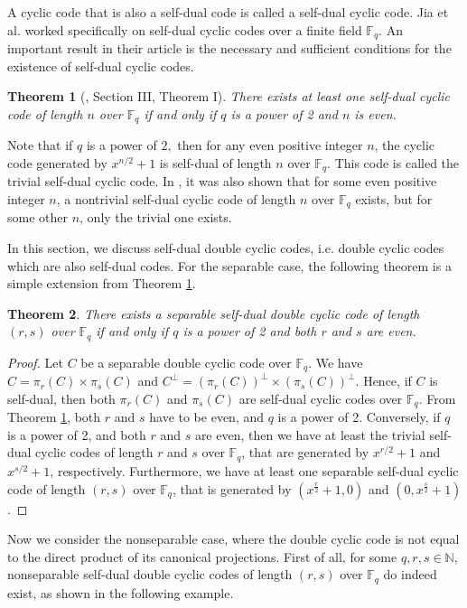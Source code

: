 \documentclass[12pt]{article}
\newtheorem{theorem}{Theorem}[section]
\begin{document}
	A cyclic code that is also a self-dual code is called a self-dual cyclic code. Jia et al. \cite{Jia2011} worked specifically on self-dual cyclic codes over a finite field $\mathbb{F}_q.$  An important result in their article is the necessary and sufficient conditions for the existence of self-dual cyclic codes.
	\begin{theorem}[\cite{Jia2011}, Section III, Theorem I]\label{Jia31}
		There exists at least one self-dual cyclic code of length $n$ over $\mathbb{F}_q$ if and only if $q$ is a power of 2 and $n$ is even.
	\end{theorem}
	Note that if $q$ is a power of $2,$ then for any even positive integer $n$, the cyclic code generated by $x^{n/2}+1$ is self-dual of length $n$ over $\mathbb{F}_{q}$. This code is called the trivial self-dual cyclic code. In \cite{Jia2011}, it was also shown that for some even positive integer $n$, a nontrivial self-dual cyclic code of length $n$ over $\mathbb{F}_{q}$ exists, but for some other $n$, only the trivial one exists.
	
	In this section, we discuss self-dual double cyclic codes, i.e. double cyclic codes which are also self-dual codes. For the separable case, the following theorem is a simple extension from Theorem \ref{Jia31}.
	\begin{theorem}\label{existsep}
		There exists a separable self-dual double cyclic code of length $(r,s)$ over $\mathbb{F}_q$ if and only if $q$ is a power of 2 and both $r$ and $s$ are even.
	\end{theorem}
	\begin{proof}
		Let $C$ be a separable double cyclic code over $\mathbb{F}_q$. We have $C=\pi_r(C)\times \pi_s(C)$ and $C^{\perp}=(\pi_r(C))^{\perp}\times (\pi_s(C))^{\perp}$. Hence, if $C$ is self-dual, then both $\pi_r(C)$ and $\pi_s(C)$ are self-dual cyclic codes over $\mathbb{F}_q$. From Theorem \ref{Jia31}, both $r$ and $s$ have to be even, and $q$ is a power of 2. Conversely, if $q$ is a power of 2, and both $r$ and $s$ are even, then we have at least the trivial self-dual cyclic codes of length $r$ and $s$ over $\mathbb{F}_q$, that are generated by $x^{r/2}+1$ and $x^{s/2}+1$, respectively. Furthermore, we have at least one separable self-dual cyclic code of length $(r,s)$ over $\mathbb{F}_q$, that is generated by $(x^{\frac{r}{2}}+1,0)$ and $(0,x^{\frac{s}{2}}+1)$.
	\end{proof}
	
	Now we consider the nonseparable case, where the double cyclic code is not equal to the direct product of its canonical projections. First of all, for some $q,r,s\in\mathbb{N}$, nonseparable self-dual double cyclic codes of length $(r,s)$ over $\mathbb{F}_q$ do indeed exist, as shown in the following example.
	
\end{document}
